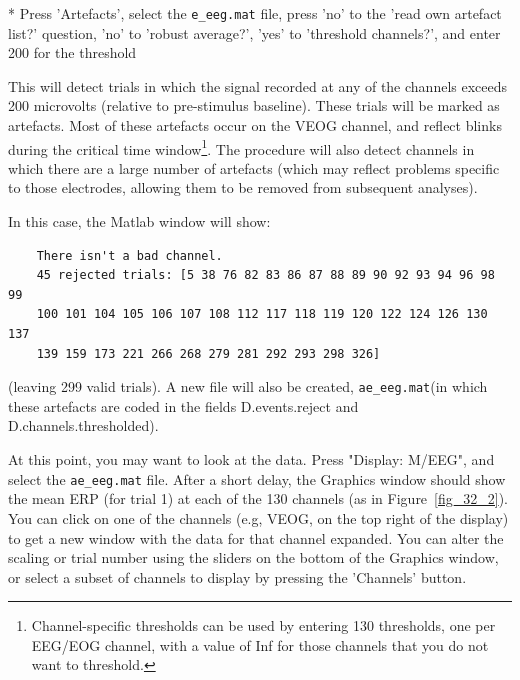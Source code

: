 * Press 'Artefacts', select the \verb!e_eeg.mat! file, press 'no' to the 'read own artefact list?' question, 'no' to 'robust average?', 'yes' to 'threshold channels?', and enter 200 for the threshold

This will detect trials in which the signal recorded at any of the channels exceeds 200 microvolts (relative to pre-stimulus baseline). These trials will be marked as artefacts. Most of these artefacts occur on the VEOG channel, and reflect blinks during the critical time window\footnote{Channel-specific thresholds can be used by entering 130 thresholds, one per EEG/EOG channel, with a value of Inf for those channels that you do not want to threshold.}. The procedure will also detect channels in which there are a large number of artefacts (which may reflect problems specific to those electrodes, allowing them to be removed from subsequent analyses).

In this case, the Matlab window will show:
\begin{verbatim}
    There isn't a bad channel.
    45 rejected trials: [5 38 76 82 83 86 87 88 89 90 92 93 94 96 98 99
    100 101 104 105 106 107 108 112 117 118 119 120 122 124 126 130 137
    139 159 173 221 266 268 279 281 292 293 298 326]
\end{verbatim}
(leaving 299 valid trials). A new file will also be created, \verb!ae_eeg.mat!(in which these artefacts are coded in the fields D.events.reject and D.channels.thresholded).

At this point, you may want to look at the data. Press "Display: M/EEG", and select the \verb!ae_eeg.mat! file. After a short delay, the Graphics window should show the mean ERP (for trial 1) at each of the 130 channels (as in Figure~\ref{fig_32_2}). You can click on one of the channels (e.g, VEOG, on the top right of the display) to get a new window with the data for that channel expanded. You can alter the scaling or trial number using the sliders on the bottom of the Graphics window, or select a subset of channels to display by pressing the 'Channels' button.

